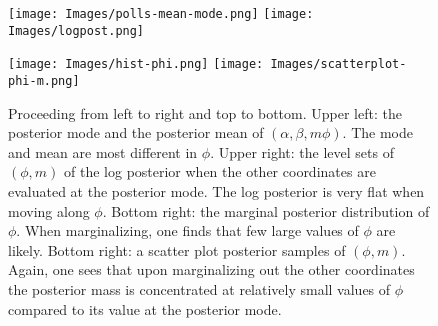 \documentclass[11pt]{article}
\begin{document}
\begin{figure}
\label{fig:phi-mm}
\centering
\texttt{[image: Images/polls-mean-mode.png]}
\texttt{[image: Images/logpost.png]}

\texttt{[image: Images/hist-phi.png]}
\texttt{[image: Images/scatterplot-phi-m.png]}

\caption{Proceeding from left to right and top to bottom.  Upper left: the
  posterior mode and the posterior mean of $(\alpha, \beta, m \phi)$.  The mode
  and mean are most different in $\phi$.  Upper right: the level sets of $(\phi,
  m)$ of the log posterior when the other coordinates are evaluated at the
  posterior mode.  The log posterior is very flat when moving along $\phi$.
  Bottom right: the marginal posterior distribution of $\phi$.  When
  marginalizing, one finds that few large values of $\phi$ are likely.  Bottom
  right: a scatter plot posterior samples of $(\phi, m)$. Again, one sees that
  upon marginalizing out the other coordinates the posterior mass is
  concentrated at relatively small values of $\phi$ compared to its value at the
  posterior mode.}
\end{figure}


{}
\end{document}
